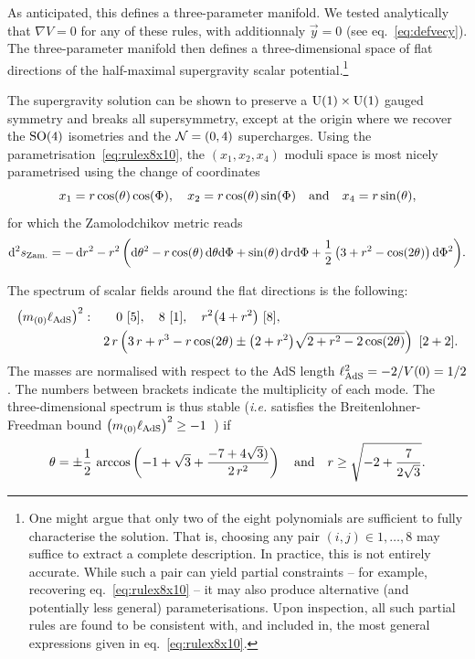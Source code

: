\documentclass[11pt,a4paper]{article}
\renewcommand{\d}{\ensuremath{\mathrm{d}}\xspace}
\begin{document}
	As anticipated, this defines a three-parameter manifold. We tested analytically that $\nabla V = 0$ for any of these rules, with additionnaly $\vec{y}=0$ (see eq.~\eqref{eq:defvecy}). The three-parameter manifold then defines a three-dimensional space of flat directions of the half-maximal supergravity scalar potential.\footnote{One might argue that only two of the eight polynomials are sufficient to fully characterise the solution. That is, choosing any pair $(i,j) \in {1, \dots, 8}$ may suffice to extract a complete description. In practice, this is not entirely accurate. While such a pair can yield partial constraints -- for example, recovering eq.~\eqref{eq:rulex8x10} -- it may also produce alternative (and potentially less general) parameterisations. Upon inspection, all such partial rules are found to be consistent with, and included in, the most general expressions given in eq.~\eqref{eq:rulex8x10}.}

	The supergravity solution can be shown to preserve a ${\rm U}(1)\times{\rm U}(1)$ gauged symmetry and breaks all supersymmetry, except at the origin where we recover the ${\rm SO}(4)$ isometries and the ${\cal N}=(0,4)$ supercharges. Using the parametrisation~\eqref{eq:rulex8x10}, the $(x_{1},x_{2},x_{4})$ moduli space is most nicely parametrised using the change of coordinates
	\begin{equation}
		x_{1} = r\cos(\theta)\cos(\Phi), \quad x_{2} = r\cos(\theta)\sin(\Phi) \quad {\rm and} \quad x_{4} = r\sin(\theta),
	\end{equation}
	for which the Zamolodchikov metric reads
	\begin{equation}
		\d^{2}s_{\rm Zam.} = -\,\d r^{2} - r^{2}\,\bigg(\d \theta^{2} - r\cos(\theta)\,\d \theta\d\Phi + \sin(\theta)\,\d r\d\Phi + \frac{1}{2}\,\big(3+r^{2}-\cos(2\theta)\big)\,\d\Phi^{2} \bigg).
	\end{equation}

	The spectrum of scalar fields around the flat directions is the following:
	\begin{equation}
		\begin{aligned}
			\big(m_{(0)}\ell_{\rm AdS}\big)^{2}: & \qquad 0 \ [5], \quad 8 \ [1], \quad r^{2}\big(4+r^{2}\big)\ [8],\\
			& \quad 2\,r\left(3\,r + r^{3} - r\cos(2\theta) \pm \big(2+r^{2}\big) \sqrt{2+r^{2}-2\cos(2\theta)} \right)\ [2+2].
		\end{aligned}
	\end{equation}
	The masses are normalised with respect to the AdS length $\ell_{\rm AdS}^{2} = -2/V(0) = 1/2$. The numbers between brackets indicate the multiplicity of each mode. The three-dimensional spectrum is thus stable (\textit{i.e.} satisfies the Breitenlohner-Freedman bound $\big(m_{(0)}\ell_{\rm AdS}\big)^{2}\geq -1$~\cite{Breitenlohner:1982jf}) if
	\begin{equation}
		\theta = \pm\frac{1}{2}\,\arccos\left(-1 + \sqrt{3} + \frac{- 7 + 4\sqrt{3})}{2\,r^2}\right) \quad {\rm and} \quad r \geq \sqrt{-2+\frac{7}{2\sqrt{3}}}.
	\end{equation}
\end{document}
